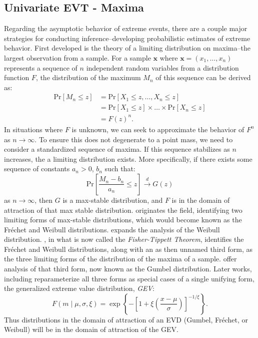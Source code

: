 \subsection{Univariate EVT - Maxima}
\label{subsec:unietvmax}
Regarding the asymptotic behavior of extreme events, there are a couple major strategies for conducting
  inference--developing probabilistic estimates of extreme behavior.  First developed is the theory
  of a limiting distribution on maxima--the largest observation from a sample.  For a sample $\bm{x}$
  where $\bm{x} = (x_1,\ldots,x_n)$ represents a sequence of $n$ independent random variables from a
  distribution function $F$, the distribution of the maximum $M_n$ of this sequence can be derived
  as:
  \begin{equation*}
    \begin{aligned}
      \text{Pr}\left[M_n\leq z\right] &= \text{Pr}\left[X_1 \leq z, \ldots, X_n \leq z\right]\\
        &= \text{Pr}\left[X_1\leq z\right]\times\ldots\times\text{Pr}\left[X_n\leq z\right]\\
        &= F(z)^n.
    \end{aligned}
  \end{equation*}
  In situations where $F$ is unknown, we can seek to approximate the behavior of $F^n$ as
  $n\rightarrow\infty$.  To ensure this does not degenerate to a point mass, we need to consider a
  standardized sequence of maxima. If this sequence stabilizes as $n$ increases, the a limiting
  distribution exists.  More specifically, if there exists some sequence of constants $a_n > 0$, $b_n$
  such that:
  \begin{equation*}
    \text{Pr}\left[\frac{M_n - b_n}{a_n} \leq z\right] \stackrel{d}{\rightarrow} G(z)
  \end{equation*}
  as $n\rightarrow\infty$, then $G$ is a max-stable distribution, and $F$ is in the domain of
  attraction of that max stable distribution.  \cite{frechet1927} originates the
  field, identifying two limiting forms of max-stable distributions, which would become known as the
  Fr{\'e}chet and Weibull distributions. \cite{weibull1951} expands the analysis of the Weibull
  distribution.  \cite{fisher1928}, in what is now called the \emph{Fisher-Tippett Theorem}, identifies
  the Fr{\'e}chet and Weibull distributions, along with an as then unnamed third form, as the three
  limiting forms of the distribution of the maxima of a sample.  \cite{gumbel1935,gumbel1942} offer
  analysis of that third form, now known as the Gumbel distribution.  Later works, including
  \cite{jenkinson1955} reparameterize all three forms as special cases of a single unifying form,
  the generalized extreme value distribution, \emph{GEV}:
  \begin{equation*}
    \label{eqn:gev}
    F(m \mid \mu, \sigma, \xi) = \exp\left\lbrace-\left[1 + \xi\left(\frac{x - \mu}{\sigma}\right)\right]_{}^{-1/{\xi}}\right\rbrace.
  \end{equation*}
  Thus distributions in the domain of attraction of an EVD (Gumbel, Fr{\'e}chet, or Weibull) will be
  in the domain of attraction of the GEV.

